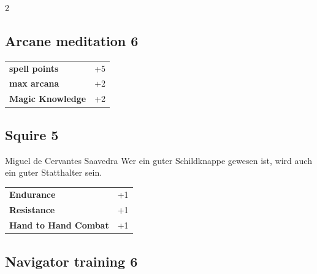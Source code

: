 \begin{multicols}{2}
\begin{tcolorbox}
    \subsection*{Arcane meditation \hfill \small{6 }}
    \tcblower




\begin{tabular}{@{}ll@{}}
    \textbf{spell points} & +5\\
    \textbf{max arcana} & +2\\
    \textbf{Magic Knowledge} & +2\\
\end{tabular}


\end{tcolorbox}

\begin{tcolorbox}
    \subsection*{Squire \hfill \small{5 }}
    \tcblower


\begin{pquote}{Miguel de Cervantes Saavedra}
Wer ein guter Schildknappe gewesen ist, wird auch ein guter Statthalter sein.
\end{pquote}

\vspace{3mm}

\begin{tabular}{@{}ll@{}}
    \textbf{Endurance} & +1\\
    \textbf{Resistance} & +1\\
    \textbf{Hand to Hand Combat} & +1\\
\end{tabular}


\end{tcolorbox}

\begin{tcolorbox}
    \subsection*{Navigator training \hfill \small{6 }}
    \tcblower





\end{tcolorbox}
\end{multicols}
